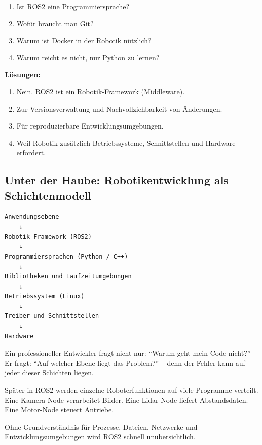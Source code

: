 \begin{quizBox}
\begin{enumerate}
  \item Ist ROS2 eine Programmiersprache?
  \item Wofür braucht man Git?
  \item Warum ist Docker in der Robotik nützlich?
  \item Warum reicht es nicht, nur Python zu lernen?
\end{enumerate}
\textbf{Lösungen:}
\begin{enumerate}
  \item Nein. ROS2 ist ein Robotik-Framework (Middleware).
  \item Zur Versionsverwaltung und Nachvollziehbarkeit von Änderungen.
  \item Für reproduzierbare Entwicklungsumgebungen.
  \item Weil Robotik zusätzlich Betriebssysteme, Schnittstellen und Hardware erfordert.
\end{enumerate}
\end{quizBox}

\begin{haubeBox}
\subsection*{Unter der Haube: Robotikentwicklung als Schichtenmodell}

\begin{lstlisting}[style=text]
Anwendungsebene
    ↓
Robotik-Framework (ROS2)
    ↓
Programmiersprachen (Python / C++)
    ↓
Bibliotheken und Laufzeitumgebungen
    ↓
Betriebssystem (Linux)
    ↓
Treiber und Schnittstellen
    ↓
Hardware
\end{lstlisting}

Ein professioneller Entwickler fragt nicht nur: \enquote{Warum geht mein Code nicht?}
Er fragt: \enquote{Auf welcher Ebene liegt das Problem?} -- denn der Fehler kann
auf jeder dieser Schichten liegen.
\end{haubeBox}

\begin{robotikBox}
Später in ROS2 werden einzelne Roboterfunktionen auf viele Programme verteilt.
Eine Kamera-Node verarbeitet Bilder. Eine Lidar-Node liefert Abstandsdaten.
Eine Motor-Node steuert Antriebe.

Ohne Grundverständnis für Prozesse, Dateien, Netzwerke und Entwicklungsumgebungen
wird ROS2 schnell unübersichtlich.
\end{robotikBox}

